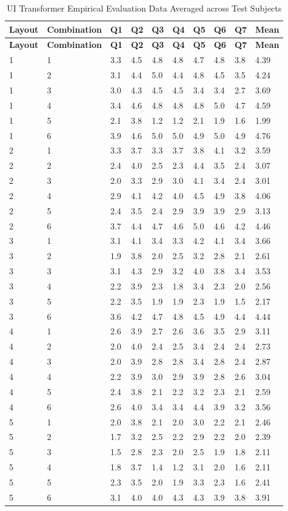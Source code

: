 \begin{appendix}
\hypertarget{tbl:uitransformer.fullempirical}{}
\begin{longtable}[hbt]{@{}llllllllll@{}}
\caption[UI Transformer Empirical Evaluation Data]{UI Transformer Empirical Evaluation Data Averaged across Test Subjects}\label{tbl:uitransformer.fullempirical}\tabularnewline
\toprule
\textbf{Layout} & \textbf{Combination} & \textbf{Q1} & \textbf{Q2} & \textbf{Q3} & \textbf{Q4} & \textbf{Q5} & \textbf{Q6} & \textbf{Q7} & \textbf{Mean}\tabularnewline
\midrule
\endfirsthead
\toprule
\textbf{Layout} & \textbf{Combination} & \textbf{Q1} & \textbf{Q2} & \textbf{Q3} & \textbf{Q4} & \textbf{Q5} & \textbf{Q6} & \textbf{Q7} & \textbf{Mean}\tabularnewline
\midrule
\endhead
1 & 1 & 3.3 & 4.5 & 4.8 & 4.8 & 4.7 & 4.8 & 3.8 & 4.39\tabularnewline
1 & 2 & 3.1 & 4.4 & 5.0 & 4.4 & 4.8 & 4.5 & 3.5 & 4.24\tabularnewline
1 & 3 & 3.0 & 4.3 & 4.5 & 4.5 & 3.4 & 3.4 & 2.7 & 3.69\tabularnewline
1 & 4 & 3.4 & 4.6 & 4.8 & 4.8 & 4.8 & 5.0 & 4.7 & 4.59\tabularnewline
1 & 5 & 2.1 & 3.8 & 1.2 & 1.2 & 2.1 & 1.9 & 1.6 & 1.99\tabularnewline
1 & 6 & 3.9 & 4.6 & 5.0 & 5.0 & 4.9 & 5.0 & 4.9 & 4.76\tabularnewline
2 & 1 & 3.3 & 3.7 & 3.3 & 3.7 & 3.8 & 4.1 & 3.2 & 3.59\tabularnewline
2 & 2 & 2.4 & 4.0 & 2.5 & 2.3 & 4.4 & 3.5 & 2.4 & 3.07\tabularnewline
2 & 3 & 2.0 & 3.3 & 2.9 & 3.0 & 4.1 & 3.4 & 2.4 & 3.01\tabularnewline
2 & 4 & 2.9 & 4.1 & 4.2 & 4.0 & 4.5 & 4.9 & 3.8 & 4.06\tabularnewline
2 & 5 & 2.4 & 3.5 & 2.4 & 2.9 & 3.9 & 3.9 & 2.9 & 3.13\tabularnewline
2 & 6 & 3.7 & 4.4 & 4.7 & 4.6 & 5.0 & 4.6 & 4.2 & 4.46\tabularnewline
3 & 1 & 3.1 & 4.1 & 3.4 & 3.3 & 4.2 & 4.1 & 3.4 & 3.66\tabularnewline
3 & 2 & 1.9 & 3.8 & 2.0 & 2.5 & 3.2 & 2.8 & 2.1 & 2.61\tabularnewline
3 & 3 & 3.1 & 4.3 & 2.9 & 3.2 & 4.0 & 3.8 & 3.4 & 3.53\tabularnewline
3 & 4 & 2.2 & 3.9 & 2.3 & 1.8 & 3.4 & 2.3 & 2.0 & 2.56\tabularnewline
3 & 5 & 2.2 & 3.5 & 1.9 & 1.9 & 2.3 & 1.9 & 1.5 & 2.17\tabularnewline
3 & 6 & 3.6 & 4.2 & 4.7 & 4.8 & 4.5 & 4.9 & 4.4 & 4.44\tabularnewline
4 & 1 & 2.6 & 3.9 & 2.7 & 2.6 & 3.6 & 3.5 & 2.9 & 3.11\tabularnewline
4 & 2 & 2.0 & 4.0 & 2.4 & 2.5 & 3.4 & 2.4 & 2.4 & 2.73\tabularnewline
4 & 3 & 2.0 & 3.9 & 2.8 & 2.8 & 3.4 & 2.8 & 2.4 & 2.87\tabularnewline
4 & 4 & 2.2 & 3.9 & 3.0 & 2.9 & 3.9 & 2.8 & 2.6 & 3.04\tabularnewline
4 & 5 & 2.4 & 3.8 & 2.1 & 2.2 & 3.2 & 2.3 & 2.1 & 2.59\tabularnewline
4 & 6 & 2.6 & 4.0 & 3.4 & 3.4 & 4.4 & 3.9 & 3.2 & 3.56\tabularnewline
5 & 1 & 2.0 & 3.8 & 2.1 & 2.0 & 3.0 & 2.2 & 2.1 & 2.46\tabularnewline
5 & 2 & 1.7 & 3.2 & 2.5 & 2.2 & 2.9 & 2.2 & 2.0 & 2.39\tabularnewline
5 & 3 & 1.5 & 2.8 & 2.3 & 2.0 & 2.5 & 1.9 & 1.8 & 2.11\tabularnewline
5 & 4 & 1.8 & 3.7 & 1.4 & 1.2 & 3.1 & 2.0 & 1.6 & 2.11\tabularnewline
5 & 5 & 2.3 & 3.5 & 2.0 & 1.9 & 3.3 & 2.3 & 1.6 & 2.41\tabularnewline
5 & 6 & 3.1 & 4.0 & 4.0 & 4.3 & 4.3 & 3.9 & 3.8 & 3.91\tabularnewline
\bottomrule
\end{longtable}


\end{appendix}
